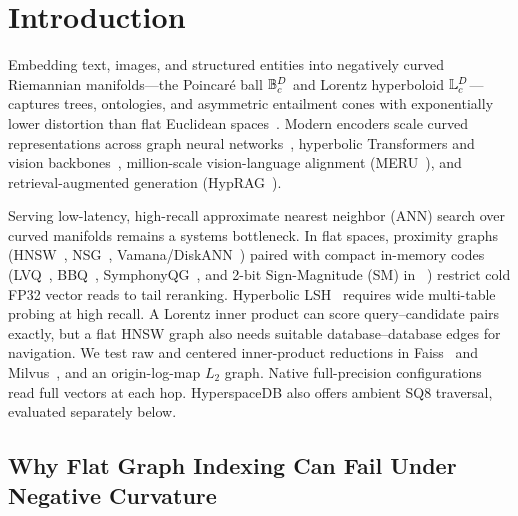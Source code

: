 \section{Introduction}
\label{sec:intro}

Embedding text, images, and structured entities into negatively curved {Riemannian} manifolds---the {Poincar\'e} ball $\mathbb{B}_c^D$ and {Lorentz} hyperboloid $\mathbb{L}_c^D$---captures trees, ontologies, and asymmetric entailment cones with exponentially lower distortion than flat {Euclidean} spaces~\cite{nickel2017poincare,sala2018representation,ganea2018entailment,gu2019mixed}.
Modern encoders scale curved representations across graph neural networks~\cite{nickel2018lorentz,chami2019hgcn}, hyperbolic Transformers and vision backbones~\cite{chen2022fully,khrulkov2020hyperbolic,ermolov2022hyperbolic}, million-scale vision-language alignment ({MERU}~\cite{desai2023meru}), and retrieval-augmented generation ({HypRAG}~\cite{madhu2026hyprag,lewis2020rag}).

Serving low-latency, high-recall approximate nearest neighbor ({ANN}) search over curved manifolds remains a systems bottleneck.
In flat spaces, proximity graphs ({HNSW}~\cite{malkov2020hnsw}, {NSG}~\cite{fu2019nsg}, {Vamana}/{DiskANN}~\cite{subramanya2019diskann,azizi2025graph}) paired with compact in-memory codes ({LVQ}~\cite{aguerrebere2023similarity}, {BBQ}~\cite{trent2024bbq}, {SymphonyQG}~\cite{gou2025symphonyqg}, and 2-bit Sign-Magnitude ({SM}) in {\quiver}~\cite{xiao2026quiver}) restrict cold FP32 vector reads to tail reranking.
Hyperbolic {LSH}~\cite{deng2026hyperboliclsh} requires wide multi-table probing at high recall. A Lorentz inner product can score query--candidate pairs exactly, but a flat {HNSW} graph also needs suitable database--database edges for navigation. We test raw and centered inner-product reductions in {Faiss}~\cite{johnson2019billion,douze2024faiss} and {Milvus}~\cite{wang2021milvus}, and an origin-log-map $L_2$ graph. Native full-precision configurations~\cite{boytsov2013engineering,prokhorenkova2022hyperbolic,glukhota2026hyperspacedb} read full vectors at each hop. {HyperspaceDB} also offers ambient SQ8 traversal, evaluated separately below.

\subsection{Why Flat Graph Indexing Can Fail Under Negative Curvature}
\label{subsec:intro_obstructions}

